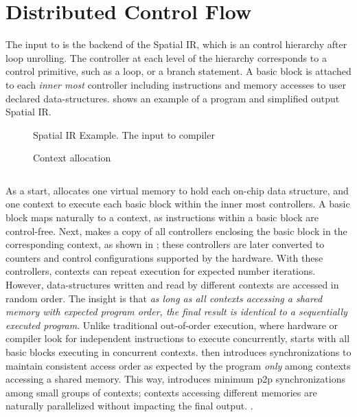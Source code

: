 \section{Distributed Control Flow}
\label{sec:control}

The input to \name is the backend of the Spatial IR, which is an control hierarchy after loop
unrolling.
The controller at each level of the hierarchy corresponds to a control primitive, such as a loop, or
a branch statement. A basic block is attached to each \emph{inner most} controller including instructions
and memory accesses to user declared data-structures.
 shows an example of a program and simplified output Spatial IR.

\begin{figure}
\centering
\caption[Spatial IR example]{Spatial IR Example. The input to \name compiler}
\label{fig:spatialir}
\end{figure}

\begin{figure}
\centering
\caption[Context allocation]{Context allocation}
\label{fig:contextalloc}
\end{figure}

\inputminted{python}{code/spatialir.py}

As a start, \name allocates one virtual memory to hold each on-chip data structure, and 
one context to execute each basic block within the inner most controllers. 
A basic block maps naturally to a context, as instructions within a basic block are control-free. 
Next, \name makes a copy of all controllers enclosing the basic block in the corresponding context, as
shown in ;
these controllers are later converted to counters and control configurations supported by the
hardware. 
With these controllers, contexts can repeat execution for expected number iterations. However,
data-structures written and read by different contexts are accessed in random order.
The insight is that \emph{as long as all contexts accessing a shared memory with expected program order,
the final result is identical to a sequentially executed program}.
Unlike traditional out-of-order execution, where hardware or compiler look for independent instructions to
execute concurrently, \name starts with all basic blocks executing in concurrent contexts.
\name then introduces synchronizations to maintain consistent access order as expected by the 
program \emph{only} among contexts accessing a shared memory. 
This way, \name introduces minimum p2p synchronizations among small groups of contexts; contexts
accessing different memories are naturally parallelized without impacting the final output.
.

